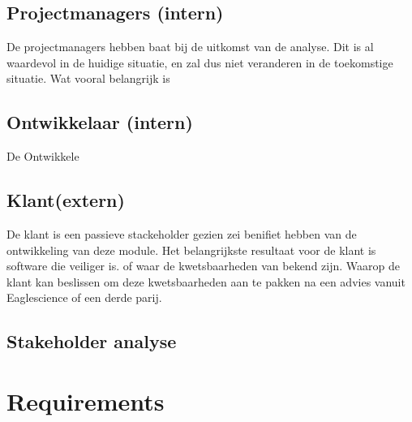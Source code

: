 \subsection{Projectmanagers (intern)}
De projectmanagers hebben baat bij de uitkomst van de analyse. Dit is al waardevol in de huidige situatie, en zal dus niet veranderen in de toekomstige situatie. Wat vooral belangrijk is
\subsection{Ontwikkelaar (intern)}
De Ontwikkele
\subsection{Klant(extern)}
De klant is een passieve stackeholder gezien zei benifiet hebben van de ontwikkeling van deze module. Het belangrijkste resultaat voor de klant is software die veiliger is. of waar de kwetsbaarheden van bekend zijn. Waarop de klant kan beslissen om deze kwetsbaarheden aan te pakken na een advies vanuit Eaglescience of een derde parij.

\subsection{Stakeholder analyse}


\section{Requirements}
